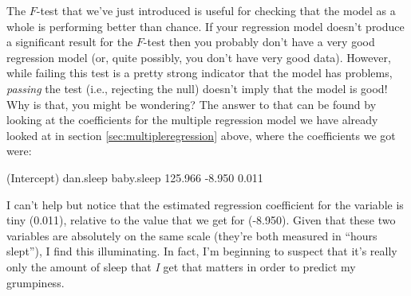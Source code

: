The $F$-test that we've just introduced is useful for checking that the model as a whole is performing better than chance. If your regression model doesn't produce a significant result for the $F$-test then you probably don't have a very good regression model (or, quite possibly, you don't have very good data). However, while failing this test is a pretty strong indicator that the model has problems, {\it passing} the test (i.e., rejecting the null) doesn't imply that the model is good! Why is that, you might be wondering? The answer to that can be found by looking at the coefficients for the multiple regression model we have already looked at in section \ref{sec:multipleregression} above, where the coefficients we got were:

\begin{rblock1}
(Intercept)    dan.sleep   baby.sleep  
  125.966        -8.950       0.011  
\end{rblock1}

I can't help but notice that the estimated regression coefficient for the  variable is tiny (0.011), relative to the value that we get for  (-8.950). Given that these two variables are absolutely on the same scale (they're both measured in ``hours slept''), I find this illuminating. In fact, I'm beginning to suspect that it's really only the amount of sleep that {\it I} get that matters in order to predict my grumpiness.

